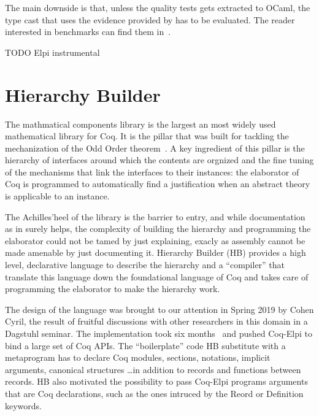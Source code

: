 \documentclass[a4paper, 11pt]{book}
\begin{document}
The main downside is that, unless the quality tests gets extracted to
OCaml, the type cast that uses the evidence provided by 
has to be evaluated. The reader interested in benchmarks
can find them in~\cite{gregoire:hal-03800154}.

TODO Elpi instrumental

\section{Hierarchy Builder}

The mathmatical components library is the largest an most widely used
mathematical library for Coq. It is the pillar that was built for
tackling the mechanization of the Odd Order theorem~\cite{}.
A key ingredient of this pillar is the hierarchy of interfaces around which
the contents are orgnized and the fine tuning of the mechanisms that
link the interfaces to their instances: the elaborator of Coq is
programmed to automatically find a justification when an abstract theory
is applicable to an instance.

The Achilles'heel of the library is the barrier to entry, and while
documentation as in \cite{assia_mahboubi_2022_7118596} surely helps,
the complexity of building the hierarchy and programming the elaborator
could not be tamed by just explaining, exacly as assembly cannot be made
amenable by just documenting it. Hierarchy Builder (HB) provides a high level,
declarative language to describe the hierarchy and a ``compiler'' that
translate this language down the foundational language of Coq and takes
care of programming the elaborator to make the hierarchy work.

The design of the language was brought to our attention in Spring 2019
by Cohen Cyril, the result of fruitful discussions with other
researchers in this domain in a Dagstuhl seminar. The implementation
took six months~\cite{cohen_et_al:LIPIcs.FSCD.2020.34} and pushed
Coq-Elpi to bind a large set of Coq APIs. The ``boilerplate'' code
HB substitute with a metaprogram has to declare Coq modules, sections,
notations, implicit arguments, canonical structures \ldots in addition
to records and functions between records. HB also motivated the possibility
to pass Coq-Elpi programs arguments that are Coq declarations, such as the ones intruced by
the Reord or Definition keywords.
\end{document}
